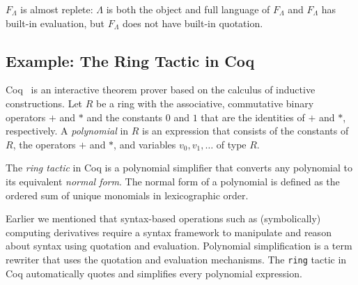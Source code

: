 \documentclass[11pt,fleqn]{article}
\newcommand{\bsp}{\begin{sloppypar}}
\newcommand{\esp}{\end{sloppypar}}
\newcommand{\mlist}[1]{{[ #1 ]}}
\newcommand{\bsynbrack}[1]{\lceil#1\rceil}
\begin{document}
\bigskip

$F_{\Lambda}$ is almost replete: $\Lambda$ is both the object and full
language of $F_{\Lambda}$ and $F_{\Lambda}$ has built-in evaluation,
but $F_{\Lambda}$ does not have built-in quotation.

\iffalse
$F_{\Lambda}$ does not have built-in quotation, but this can be
defined in $F_{\Lambda}$ by introducing a constant $C$ such that $C~M
= \bsynbrack{M}$ for all $M \in \Lambda$.  Hence the Mogensen
self-interpretation of lambda calculus can be formulated as a replete
syntax framework.
\fi

\iffalse
\bsp Mogensen also introduces a {\em self-reducer} $R$ for
$\lambda$-terms such that $R ~ \bsynbrack{M} =_{\beta} \bsynbrack{{\rm
    NF}_M}$ and provides a proof of correctness for the
self-reducer. Let $M \in \Lambda$ be a $\lambda$-term and
$\overline{M} \in {\Lambda}^m$ be the marked expression
$M\mlist{(p,\bsynbrack{M})}$, where $p$ is the top position in $M$, as
in section~\ref{subsec:marked-expr}.  Then $\overline{Q}(\overline{M})
= \bsynbrack{E^{\ast}(\bsynbrack{M})} = \bsynbrack{{\rm
    NF}_M}$. Therefore, $R ~ \bsynbrack{M} =_{\beta}
\overline{Q}(M\mlist{(p,\bsynbrack{M})})$ and the self-reducer for
lambda calculus is a built-in special form of the quasiquotation in
syntax frameworks.  \esp
\fi

\subsection{Example: The Ring Tactic in Coq} \label{subsec:coq}
Coq~\cite{Coq8.4} is an interactive theorem prover based on the
calculus of inductive constructions. Let $R$ be a ring with the
associative, commutative binary operators $+$ and $*$ and the
constants $0$ and $1$ that are the identities of $+$ and $*$,
respectively. A {\em polynomial} in $R$ is an expression that consists
of the constants of $R$, the operators $+$ and $*$, and variables
$v_0, v_1, \dots$ of type $R$.

The {\em ring tactic} in Coq is a polynomial simplifier that converts
any polynomial to its equivalent {\em normal form}. The normal form of
a polynomial is defined as the ordered sum of unique monomials in
lexicographic order.

Earlier we mentioned that syntax-based operations such as
(symbolically) computing derivatives require a syntax framework to
manipulate and reason about syntax using quotation and evaluation.
Polynomial simplification is a term rewriter that uses the quotation
and evaluation mechanisms.  The {\tt ring} tactic in Coq automatically
quotes and simplifies every polynomial expression.
\end{document}
